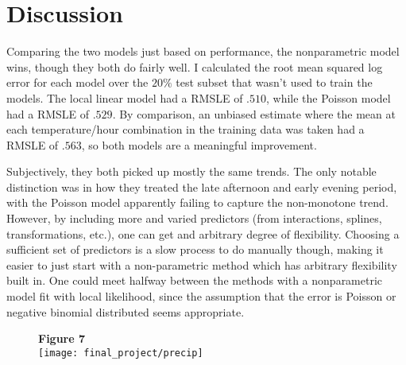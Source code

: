 \documentclass[11pt]{article}
\theoremstyle{definition}
\begin{document}
\section{Discussion} 
Comparing the two models just based on performance, the nonparametric model wins, though they both do fairly well. I calculated the root mean squared log error for each model over the $20\%$ test subset that wasn't used to train the models. The local linear model had a RMSLE of $.510$, while the Poisson model had a RMSLE of $.529$. By comparison, an unbiased estimate where the mean at each temperature/hour combination in the training data was taken had a RMSLE of $.563$, so both models are a meaningful improvement. \par
Subjectively, they both picked up mostly the same trends. The only notable distinction was in how they treated the late afternoon and early evening period, with the Poisson model apparently failing to capture the non-monotone trend. However, by including more and varied predictors (from interactions, splines, transformations, etc.), one can get and arbitrary degree of flexibility. Choosing a sufficient set of predictors is a slow process to do manually though, making it easier to just start with a non-parametric method which has arbitrary flexibility built in. One could meet halfway between the methods with a nonparametric model fit with local likelihood, since the assumption that the error is Poisson or negative binomial distributed seems appropriate. \par
\begin{figure}[h]
    {\bf Figure 7} \\
    \texttt{[image: final\_project/precip]}
\end{figure}
\end{document}
